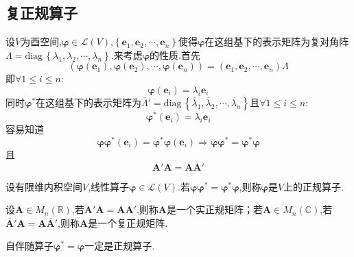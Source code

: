 \subsection{复正规算子}
设$V$为酉空间,$\bm{\varphi}\in\mathcal{L}\left(V\right)$,$\left\{
    \bm{e}_1,\bm{e}_2,\cdots,\bm{e}_n
\right\}$使得$\bm{\varphi}$在这组基下的表示矩阵为复对角阵$\bm{\varLambda}=\mathrm{diag}\,\left\{
    \lambda_1,\lambda_2,\cdots,\lambda_n
\right\}$.来考虑$\bm{\varphi}$的性质.首先\[
\left(
    \bm{\varphi}\left(
        \bm{e}_1
        \right),\bm{\varphi}\left(
            \bm{e}_2
        \right),\cdots,\bm{\varphi}\left(
            \bm{e}_n
            \right)\right)=\left(
                \bm{e}_1,\bm{e}_2,\cdots,\bm{e}_n
            \right)\bm{\varLambda}     
\]即$\forall 1\leqslant i\leqslant n:$\[
\bm{\varphi}\left(
    \bm{e}_i
\right)=\lambda_i\bm{e}_i
\]同时$\bm{\varphi}^*$在这组基下的表示矩阵为$\overline{\bm{\varLambda}}'=\mathrm{diag}\,\left\{
    \overline{\lambda}_1,\overline{\lambda}_2,\cdots,\overline{\lambda}_n
\right\}$且$\forall 1\leqslant i\leqslant n:$\[
\bm{\varphi}^*\left(
    \bm{e}_i
\right)=\overline{\lambda}_i\bm{e}_i
\]容易知道\[
\bm{\varphi}\bm{\varphi}^*\left(
    \bm{e}_i
    \right)=\bm{\varphi}^*\bm{\varphi}\left(
        \bm{e}_i
    \right)\Longrightarrow\bm{\varphi\varphi}^*=\bm{\varphi}^*\bm{\varphi}
\]且\[
\overline{\bm{A}}'\bm{A}=\bm{A}\overline{\bm{A}}'
\]
\begin{formal}
    \begin{definition}[正规算子的定义]\label{def:正规算子的定义}
        设有限维内积空间$V$,线性算子$\bm{\varphi}\in\mathcal{L}\left(V\right)$.若$\bm{\varphi\varphi}^*=\bm{\varphi}^*\bm{\varphi}$,则称$\bm{\varphi}$是$V$上的正规算子.
    \end{definition}
\end{formal}
\begin{formal}
    \begin{definition}[正规矩阵的定义]\label{def:正规矩阵的定义}
        设$\bm{A}\in M_n\left(\mathbb{R}\right)$,若$\bm{A}'\bm{A}=\bm{AA}'$,则称$\bm{A}$是一个实正规矩阵；若$\bm{A}\in M_n\left(\mathbb{C}\right)$,若$\overline{\bm{A}}'\bm{A}=\bm{A}\overline{\bm{A}}'$,则称$\bm{A}$是一个复正规矩阵.
    \end{definition}
\end{formal}
\begin{brown}
    \begin{example}
        自伴随算子$\bm{\varphi}^*=\bm{\varphi}$一定是正规算子.
    \end{example}
\end{brown}

